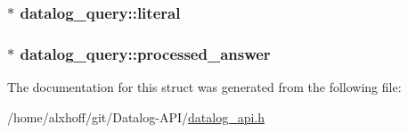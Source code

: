 \subsubsection[{\texorpdfstring{literal}{literal}}]{$\ast$ datalog\+\_\+query\+::literal}\hypertarget{structdatalog__query_ae91a9dea687ce035816c38593d171e75}{}\label{structdatalog__query_ae91a9dea687ce035816c38593d171e75}
\subsubsection[{\texorpdfstring{processed\+\_\+answer}{processed_answer}}]{$\ast$ datalog\+\_\+query\+::processed\+\_\+answer}\hypertarget{structdatalog__query_a54e2eef2c18bc5e4c0f0a6c10f1e6397}{}\label{structdatalog__query_a54e2eef2c18bc5e4c0f0a6c10f1e6397}


The documentation for this struct was generated from the following file\+:\begin{DoxyCompactItemize}
\item 
/home/alxhoff/git/\+Datalog-\/\+A\+P\+I/\hyperlink{datalog__api_8h}{datalog\+\_\+api.\+h}\end{DoxyCompactItemize}

